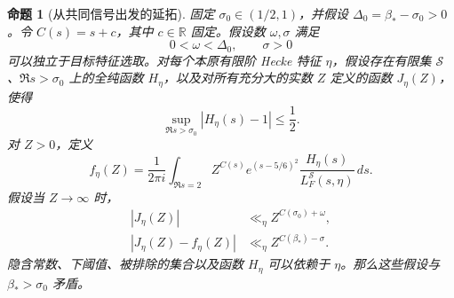 \documentclass[11pt,a4paper]{article}
\numberwithin{equation}{section}
\numberwithin{figure}{section}
\newtheorem{proposition}[theorem]{命题}
\theoremstyle{definition}
\theoremstyle{remark}
\begin{document}
\begin{proposition}[从共同信号出发的延拓]
\label{lem:continuation-criterion}
固定 $\sigma_0\in(1/2,1)$，并假设 $\Delta_0=\beta_*-\sigma_0>0$。令 $C(s)=s+c$，其中 $c\in\mathbb R$ 固定。假设数 $\omega,\sigma$ 满足
\[
 0<\omega<\Delta_0,\qquad \sigma>0
\]
可以独立于目标特征选取。对每个本原有限阶 Hecke 特征 $\eta$，假设存在有限集 $\mathcal S$、$\Re s>\sigma_0$ 上的全纯函数 $H_\eta$，以及对所有充分大的实数 $Z$ 定义的函数 $J_\eta(Z)$，使得
\begin{equation}
 \sup_{\Re s>\sigma_0}|H_\eta(s)-1|\le\frac12.
 \label{eq:signal-euler-contract}
\end{equation}
对 $Z>0$，定义
\begin{equation}
 f_\eta(Z)=\frac1{2\pi i}\int_{\Re s=2}
 Z^{C(s)}e^{(s-5/6)^2}
 \frac{H_\eta(s)}{L_F^{\mathcal S}(s,\eta)}\,ds.
 \label{eq:common-residue}
\end{equation}
假设当 $Z\to\infty$ 时，
\begin{align}
 |J_\eta(Z)|&\ll_\eta Z^{C(\sigma_0)+\omega},
       \label{eq:low-probe-contract}\\
 |J_\eta(Z)-f_\eta(Z)|&\ll_\eta Z^{C(\beta_*)-\sigma}.
       \label{eq:high-probe-contract}
\end{align}
隐含常数、下阈值、被排除的集合以及函数 $H_\eta$ 可以依赖于 $\eta$。那么这些假设与 $\beta_*>\sigma_0$ 矛盾。
\end{proposition}
\end{document}

